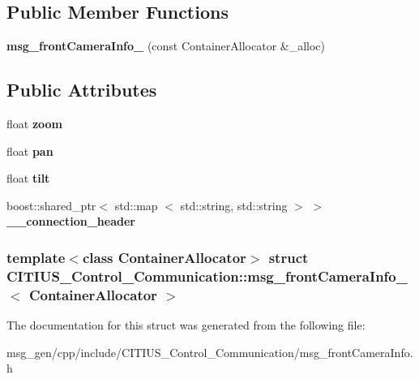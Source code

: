 \subsection*{\-Public \-Member \-Functions}
\begin{DoxyCompactItemize}
\item 
\hypertarget{struct_c_i_t_i_u_s___control___communication_1_1msg__front_camera_info___a0ad7404c44827e0158c1a0c29372c9a9}{{\bfseries msg\-\_\-front\-Camera\-Info\-\_\-} (const \-Container\-Allocator \&\-\_\-alloc)}\label{struct_c_i_t_i_u_s___control___communication_1_1msg__front_camera_info___a0ad7404c44827e0158c1a0c29372c9a9}

\end{DoxyCompactItemize}
\subsection*{\-Public \-Attributes}
\begin{DoxyCompactItemize}
\item 
\hypertarget{struct_c_i_t_i_u_s___control___communication_1_1msg__front_camera_info___ade12a0d92e1d120ece53909da96878a4}{float {\bfseries zoom}}\label{struct_c_i_t_i_u_s___control___communication_1_1msg__front_camera_info___ade12a0d92e1d120ece53909da96878a4}

\item 
\hypertarget{struct_c_i_t_i_u_s___control___communication_1_1msg__front_camera_info___ab8e2d69cbcb9b2878dfba24616663d6d}{float {\bfseries pan}}\label{struct_c_i_t_i_u_s___control___communication_1_1msg__front_camera_info___ab8e2d69cbcb9b2878dfba24616663d6d}

\item 
\hypertarget{struct_c_i_t_i_u_s___control___communication_1_1msg__front_camera_info___ae9c329c96a871386ef31ff68b0eddaba}{float {\bfseries tilt}}\label{struct_c_i_t_i_u_s___control___communication_1_1msg__front_camera_info___ae9c329c96a871386ef31ff68b0eddaba}

\item 
\hypertarget{struct_c_i_t_i_u_s___control___communication_1_1msg__front_camera_info___aea0b1ec1cdcfc613069bff68744b6975}{boost\-::shared\-\_\-ptr$<$ std\-::map\*
$<$ std\-::string, std\-::string $>$ $>$ {\bfseries \-\_\-\-\_\-connection\-\_\-header}}\label{struct_c_i_t_i_u_s___control___communication_1_1msg__front_camera_info___aea0b1ec1cdcfc613069bff68744b6975}

\end{DoxyCompactItemize}
\subsubsection*{template$<$class Container\-Allocator$>$ struct C\-I\-T\-I\-U\-S\-\_\-\-Control\-\_\-\-Communication\-::msg\-\_\-front\-Camera\-Info\-\_\-$<$ Container\-Allocator $>$}



\-The documentation for this struct was generated from the following file\-:\begin{DoxyCompactItemize}
\item 
msg\-\_\-gen/cpp/include/\-C\-I\-T\-I\-U\-S\-\_\-\-Control\-\_\-\-Communication/msg\-\_\-front\-Camera\-Info.\-h\end{DoxyCompactItemize}
